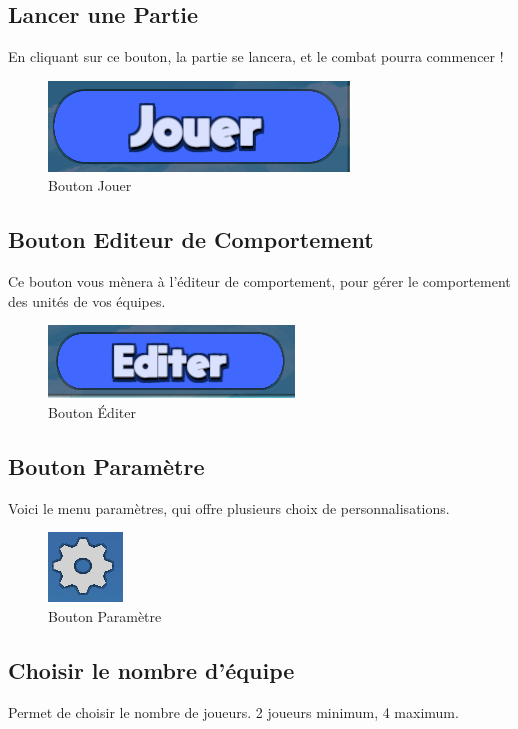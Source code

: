 \documentclass{report}
\begin{document}
\subsection{Lancer une Partie}
En cliquant sur ce bouton, la partie se lancera, et le combat pourra commencer !

\begin{figure}[!h]
	\centering
		\includegraphics[scale=0.65]{BoutonJouer}
	\caption{Bouton Jouer}
\end{figure}
\subsection{Bouton Editeur de Comportement}
Ce bouton vous mènera à l’éditeur de comportement, pour gérer le comportement des unités de vos équipes.

\begin{figure}[!h]
	\centering
		\includegraphics[scale=0.80]{Bouton_Editer}
	\caption{Bouton Éditer}
\end{figure}
\subsection{Bouton Paramètre}
Voici le menu paramètres, qui offre plusieurs choix de personnalisations.

\begin{figure}[!h]
	\centering
		\includegraphics[scale=0.80]{Bouton_Parametre}
	\caption{Bouton Paramètre}
\end{figure}
\subsection{Choisir le nombre d'équipe}
Permet de choisir le nombre de joueurs. 2 joueurs minimum, 4 maximum.
\end{document}
